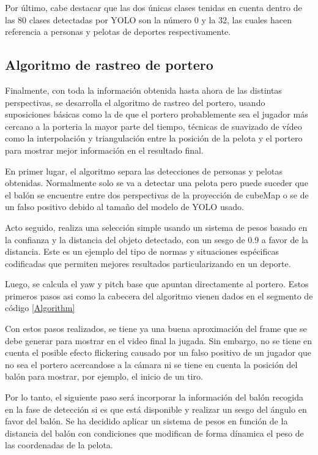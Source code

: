 Por último, cabe destacar que las dos únicas clases tenidas en cuenta dentro de las 80 clases detectadas por YOLO son la número 0 y la 32, las cuales hacen referencia a personas y pelotas de deportes respectivamente.

\subsection{Algoritmo de rastreo de portero}
Finalmente, con toda la información obtenida hasta ahora de las distintas perspectivas, se desarrolla el algoritmo de rastreo del portero, usando suposiciones básicas como la de que el portero probablemente sea el jugador más cercano a la porteria la mayor parte del tiempo, técnicas de suavizado de vídeo como la interpolación y triangulación entre la posición de la pelota y el portero para mostrar mejor información en el resultado final.

En primer lugar, el algoritmo separa las detecciones de personas y pelotas obtenidas. Normalmente solo se va a detectar una pelota pero puede suceder que el balón se encuentre entre dos perspectivas de la proyección de cubeMap o se de un falso positivo debido al tamaño del modelo de YOLO usado. 

Acto seguido, realiza una selección simple usando un sistema de pesos basado en la confianza y la distancia del objeto detectado, con un sesgo de 0.9 a favor de la distancia. Este es un ejemplo del tipo de normas y situaciones espécificas codificadas que permiten mejores resultados particularizando en un deporte.

Luego, se calcula el yaw y pitch base que apuntan directamente al portero. Estos primeros pasos asi como la cabecera del algoritmo vienen dados en el segmento de código \ref{Algorithm}


Con estos pasos realizados, se tiene ya una buena aproximación del frame que se debe generar para mostrar en el video final la jugada. Sin embargo, no se tiene en cuenta el posible efecto flickering causado por un falso positivo de un jugador que no sea el portero acercandose a la cámara ni se tiene en cuenta la posición del balón para mostrar, por ejemplo, el inicio de un tiro.

Por lo tanto, el siguiente paso será incorporar la información del balón recogida en la fase de detección si es que está disponible y realizar un sesgo del ángulo en favor del balón. Se ha decidido aplicar un sistema de pesos en función de la distancia del balón con condiciones que modifican de forma dínamica el peso de las coordenadas de la pelota.


